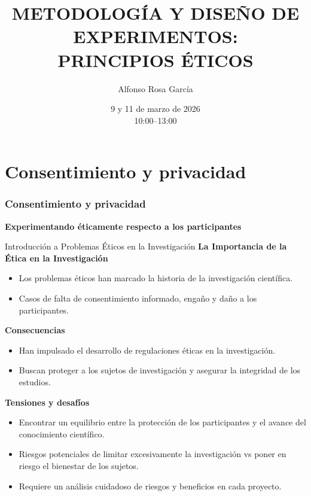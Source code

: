 ﻿\documentclass{beamer}
\title[DISEÑO DE EXPERIMENTOS]{METODOLOGÍA Y DISEÑO DE EXPERIMENTOS: \\ PRINCIPIOS ÉTICOS}
\author[Alfonso Rosa García]{Alfonso Rosa García }
\institute[G9]{\textbf{Grupo de Universidades G-9}}
\date{9 y 11 de marzo de 2026 \\ 10:00--13:00}
\begin{document}
\begin{frame}
  \titlepage
\end{frame}


\section{Consentimiento y privacidad}
\begin{frame}
    \frametitle{Consentimiento y privacidad}
    \centering
    \textbf{\Large Experimentando éticamente respecto a los participantes}
    \vspace{0.5cm}
\end{frame}

\begin{frame}{Introducción a Problemas Éticos en la Investigación}
\textbf{La Importancia de la Ética en la Investigación}
\begin{itemize}
\item Los problemas éticos han marcado la historia de la investigación científica.
\item Casos de falta de consentimiento informado, engaño y daño a los participantes.
\end{itemize}
\textbf{Consecuencias}
\begin{itemize}
    \item Han impulsado el desarrollo de regulaciones éticas en la investigación.
    \item Buscan proteger a los sujetos de investigación y asegurar la integridad de los estudios.
\end{itemize}
\textbf{Tensiones y desafíos}
\begin{itemize}
    \item Encontrar un equilibrio entre la protección de los participantes y el avance del conocimiento científico.
    \item Riesgos potenciales de limitar excesivamente la investigación vs poner en riesgo el bienestar de los sujetos.
    \item Requiere un análisis cuidadoso de riesgos y beneficios en cada proyecto.
\end{itemize}
\end{frame}
\end{document}

